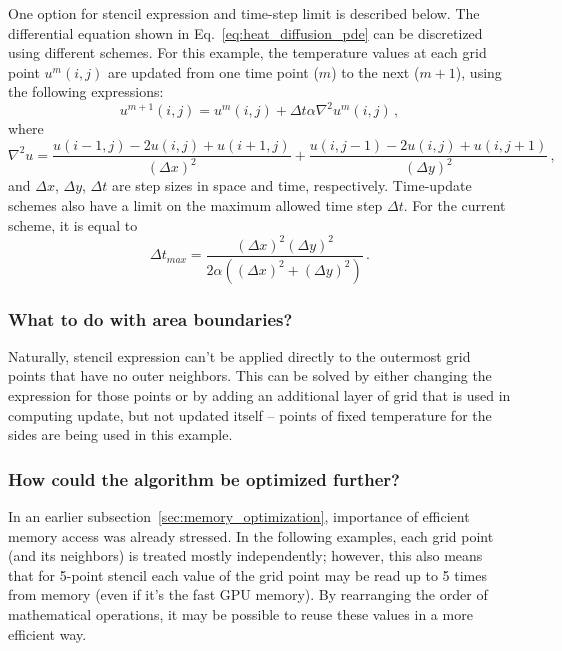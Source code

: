 \par
One option for stencil expression and time-step limit is described below.
The differential equation shown in Eq.~\ref{eq:heat_diffusion_pde} can be discretized using different schemes.
For this example, the temperature values at each grid point $u^m(i,j)$ are updated from one time point ($m$) to the next ($m+1$), using the following expressions:
\begin{equation}
    u^{m+1}(i,j) = u^m(i,j) + \Delta t \alpha \nabla^2 u^m(i,j) \,,
\end{equation}
where 
\begin{equation}
    \nabla^2u = \frac{u(i-1,j)-2u(i,j)+u(i+1,j)}{(\Delta x)^2} + \frac{u(i,j-1)-2u(i,j)+u(i,j+1)}{(\Delta y)^2}\,,
\end{equation}
and $\Delta x$, $\Delta y$, $\Delta t$ are step sizes in space and time, respectively.
Time-update schemes also have a limit on the maximum allowed time step $\Delta t$.
For the current scheme, it is equal to
\begin{equation}
    \Delta t_{max} = \frac{(\Delta x)^2(\Delta y)^2}{2\alpha((\Delta x)^2+(\Delta y)^2)}\,.
\end{equation}


\subsubsection{What to do with area boundaries?}


\par
Naturally, stencil expression can’t be applied directly to the outermost grid points that have no outer neighbors. This can be solved by either changing the expression for those points or by adding an additional layer of grid that is used in computing update, but not updated itself – points of fixed temperature for the sides are being used in this example.


\subsubsection{How could the algorithm be optimized further?}


\par
In an earlier subsection~\ref{sec:memory_optimization}, importance of efficient memory access was already stressed.
In the following examples, each grid point (and its neighbors) is treated mostly independently; however, this also means that for 5-point stencil each value of the grid point may be read up to 5 times from memory (even if it’s the fast GPU memory).
By rearranging the order of mathematical operations, it may be possible to reuse these values in a more efficient way.


